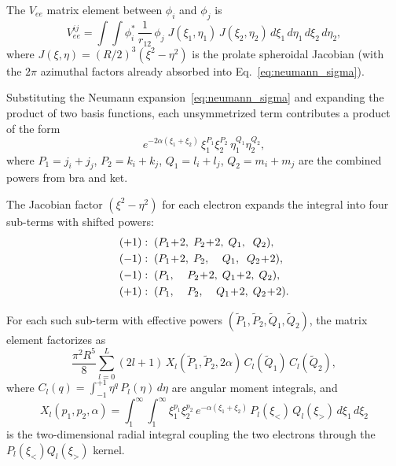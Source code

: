 \documentclass[aps,pra,twocolumn,superscriptaddress,longbibliography]{revtex4-2}
\begin{document}
The $V_{ee}$ matrix element between $\phi_i$ and $\phi_j$ is
\begin{equation}
  V_{ee}^{ij} = \int\!\!\int
    \phi_i^*\,\frac{1}{r_{12}}\,\phi_j\;
    J(\xi_1,\eta_1)\,J(\xi_2,\eta_2)\,
    d\xi_1\,d\eta_1\,d\xi_2\,d\eta_2,
  \label{eq:vee_integral}
\end{equation}
where $J(\xi,\eta) = (R/2)^3(\xi^2 - \eta^2)$ is the prolate
spheroidal Jacobian (with the $2\pi$ azimuthal factors already
absorbed into Eq.~\eqref{eq:neumann_sigma}).

Substituting the Neumann expansion~\eqref{eq:neumann_sigma}
and expanding the product of two basis functions, each
unsymmetrized term contributes a product of the form
\begin{equation}
  e^{-2\alpha(\xi_1+\xi_2)}\,\xi_1^{P_1}\xi_2^{P_2}\,
  \eta_1^{Q_1}\eta_2^{Q_2},
\end{equation}
where $P_1 = j_i + j_j$, $P_2 = k_i + k_j$,
$Q_1 = l_i + l_j$, $Q_2 = m_i + m_j$ are the combined
powers from bra and ket.

The Jacobian factor $(\xi^2 - \eta^2)$ for each electron
expands the integral into four sub-terms with shifted powers:
\begin{align}
  &(+1):\; (P_1\!+\!2,\; P_2\!+\!2,\; Q_1,\;\; Q_2), \notag\\
  &(-1):\; (P_1\!+\!2,\; P_2,\;\;\;\; Q_1,\;\; Q_2\!+\!2), \notag\\
  &(-1):\; (P_1,\;\;\;\; P_2\!+\!2,\; Q_1\!+\!2,\; Q_2), \notag\\
  &(+1):\; (P_1,\;\;\;\; P_2,\;\;\;\; Q_1\!+\!2,\; Q_2\!+\!2).
  \label{eq:jacobian_expansion}
\end{align}

For each such sub-term with effective powers
$(\tilde{P}_1, \tilde{P}_2, \tilde{Q}_1, \tilde{Q}_2)$,
the matrix element factorizes as
\begin{equation}
  \frac{\pi^2 R^5}{8}\sum_{l=0}^{L}(2l+1)\,
  X_l(\tilde{P}_1, \tilde{P}_2, 2\alpha)\,
  C_l(\tilde{Q}_1)\,C_l(\tilde{Q}_2),
  \label{eq:factorized}
\end{equation}
where $C_l(q) = \int_{-1}^{+1}\eta^q\,P_l(\eta)\,d\eta$ are
angular moment integrals, and
\begin{equation}
  X_l(p_1, p_2, \alpha) = \int_1^\infty\!\!\int_1^\infty
    \xi_1^{p_1}\xi_2^{p_2}\,e^{-\alpha(\xi_1+\xi_2)}\,
    P_l(\xi_<)\,Q_l(\xi_>)\,d\xi_1\,d\xi_2
  \label{eq:Xl_def}
\end{equation}
is the two-dimensional radial integral coupling the two
electrons through the $P_l(\xi_<) Q_l(\xi_>)$ kernel.
\end{document}
